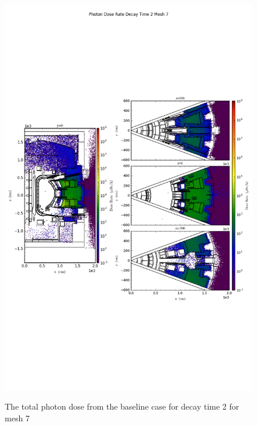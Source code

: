 \begin{figure}[ht!]
\centering
\includegraphics[trim={0cm 9cm 0cm 10cm},clip,scale=0.75]{../plots/final_model_nob4c/Photon_Dose_Rate_Decay_Time_2_Mesh_7.png}
\label{fig:photons_dc2_no4bc_m7_flux}
\caption{The total photon dose from the baseline case for decay time 2 for mesh 7}
\end{figure}
